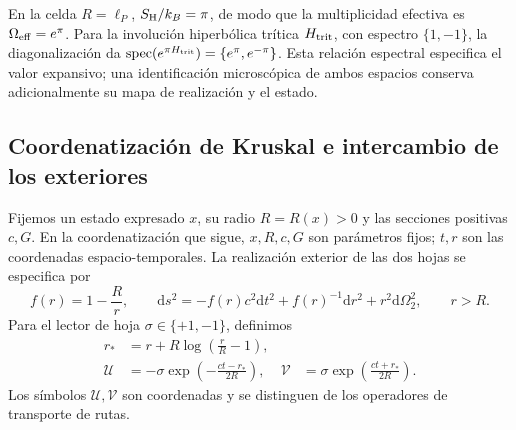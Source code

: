 En la celda \(R=\ell_P\), \(S_{\rm H}/k_B=\pi\), de modo que
la multiplicidad efectiva es \(\Omega_{\rm eff}=e^\pi\).
Para la involución hiperbólica trítica \(H_{\rm trit}\), con espectro
\(\{1,-1\}\), la diagonalización da
\(\operatorname{spec}(e^{\pi H_{\rm trit}})=\{e^\pi,e^{-\pi}\}\).
Esta relación espectral especifica el valor expansivo; una identificación
microscópica de ambos espacios conserva adicionalmente su mapa de
realización y el estado.



\subsection{Coordenatización de Kruskal e intercambio de los exteriores}
\label{vii:subsec:kruskal-dos-hojas}

Fijemos un estado expresado \(x\), su radio \(R=R(x)>0\) y las
secciones positivas \(c,G\). En la coordenatización que sigue, \(x,R,c,G\)
son parámetros fijos; \(t,r\) son las coordenadas espacio-temporales.
La realización exterior de las dos hojas se especifica por
\begin{equation}
 f(r)=1-\frac Rr,\qquad
 \mathrm ds^2=-f(r)c^2\mathrm dt^2+f(r)^{-1}\mathrm dr^2
                 +r^2\mathrm d\Omega_2^2,\qquad r>R.
 \label{vii:eq:metrica-exterior}
\end{equation}
Para el lector de hoja \(\sigma\in\{+1,-1\}\), definimos
\begin{align}
 r_*&=r+R\log\left(\frac rR-1\right),\\
 \mathcal U&=-\sigma\exp\left(-\frac{ct-r_*}{2R}\right),&
 \mathcal V&=\sigma\exp\left(\frac{ct+r_*}{2R}\right).
 \label{vii:eq:carta-kruskal}
\end{align}
Los símbolos \(\mathcal U,\mathcal V\) son coordenadas y se
distinguen de los operadores de transporte de rutas.

